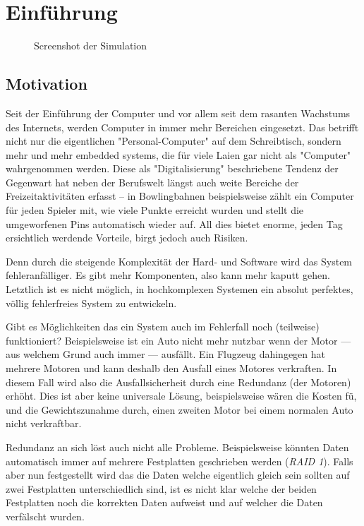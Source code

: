 \section{Einf{\"{u}}hrung}
\begin{figure}
	\centering
	\caption{Screenshot der Simulation}
	\label{fig:simulation}
\end{figure}

\subsection{Motivation}
Seit der Einf{\"{u}}hrung der Computer und vor allem seit dem rasanten Wachstums des Internets, werden Computer in immer 
mehr Bereichen eingesetzt. Das betrifft nicht nur die eigentlichen "Personal-Computer" auf dem Schreibtisch, 
sondern mehr und mehr embedded systems, die f{\"{u}}r viele Laien gar nicht als "Computer" wahrgenommen werden. Diese 
als "Digitalisierung" beschriebene Tendenz der Gegenwart hat neben der Berufswelt l{\"{a}}ngst auch weite Bereiche 
der Freizeitaktivit{\"{a}}ten erfasst -- in Bowlingbahnen beispielsweise z{\"{a}}hlt ein Computer f{\"{u}}r jeden 
Spieler mit, wie viele Punkte erreicht wurden und stellt die umgeworfenen Pins automatisch wieder auf. All dies 
bietet enorme, jeden Tag ersichtlich werdende Vorteile, birgt jedoch auch Risiken. 

Denn durch die steigende Komplexit{\"{a}}t der Hard- und Software wird das System fehleranf{\"{a}}lliger. Es gibt 
mehr Komponenten, also kann mehr kaputt gehen. Letztlich ist es nicht m{\"{o}}glich, in hochkomplexen Systemen ein 
absolut perfektes, v{\"{o}}llig fehlerfreies System zu entwickeln. 

Gibt es M{\"{o}}glichkeiten das ein System auch im Fehlerfall noch (teilweise) funktioniert? Beispielsweise ist ein
Auto nicht mehr nutzbar wenn der Motor --- aus welchem Grund auch immer --- ausf{\"{a}}llt. Ein Flugzeug dahingegen
hat mehrere Motoren und kann deshalb den Ausfall eines Motores verkraften. In diesem Fall wird also die Ausfallsicherheit
durch eine Redundanz (der Motoren) erh{\"{o}}ht. Dies ist aber keine universale L{\"{o}}sung, beispielsweise w{\"{a}}ren
die Kosten f{\"{u}}, und die Gewichtszunahme durch, einen zweiten Motor bei einem normalen Auto nicht verkraftbar.

Redundanz an sich l{\"{o}}st auch nicht alle Probleme. Beispielsweise k{\"{o}}nnten Daten automatisch immer auf mehrere
Festplatten geschrieben werden (\textit{RAID 1}). Falls aber nun festgestellt wird das die Daten welche eigentlich gleich
sein sollten auf zwei Festplatten unterschiedlich sind, ist es nicht klar welche der beiden Festplatten noch die korrekten
Daten aufweist und auf welcher die Daten verf{\"{a}}lscht wurden. 

